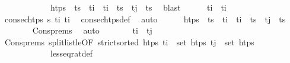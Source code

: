 \begin{isabellebody}
\ \ \ \ \ \ \ \ \ \ \ \ {\isacartoucheopen}htps\ {\isacharequal}{\kern0pt}\ ts\ {\isacharat}{\kern0pt}\ t\isactrlsub i\ {\isacharhash}{\kern0pt}\ {\isacharparenleft}{\kern0pt}t\isactrlsub i{\isacharprime}{\kern0pt}\ {\isacharhash}{\kern0pt}\ ts\ {\isacharat}{\kern0pt}\ t\isactrlsub j\ {\isacharhash}{\kern0pt}\ ts\ \isamarkupfalse%
\ blast\isanewline
\ \ \ \ \isamarkupfalse%
\ {\isachardoublequoteopen}t\isactrlsub i\ {\isasymle}\ t\isactrlsub i{\isacharprime}{\kern0pt}{\isachardoublequoteclose}\isanewline
\ \ \ \ \ \ \isamarkupfalse%
\ {\isacartoucheopen}consec{\isacharunderscore}{\kern0pt}htps\ {\isasympi}s\ t\isactrlsub i\ t\isactrlsub i{\isacharprime}{\kern0pt}{\isacartoucheclose}\ \isamarkupfalse%
\ consec{\isacharunderscore}{\kern0pt}htps{\isacharunderscore}{\kern0pt}def\ \isamarkupfalse%
\ auto\isanewline
\ \ \ \ \isamarkupfalse%
\ {\isachardoublequoteopen}htps\ {\isacharequal}{\kern0pt}\ {\isacharparenleft}{\kern0pt}ts\ {\isacharat}{\kern0pt}\ {\isacharbrackleft}{\kern0pt}t\isactrlsub i{\isacharbrackright}{\kern0pt}{\isacharparenright}{\kern0pt}\ {\isacharat}{\kern0pt}\ t\isactrlsub i{\isacharprime}{\kern0pt}\ {\isacharhash}{\kern0pt}\ ts\ {\isacharat}{\kern0pt}\ t\isactrlsub j\ {\isacharhash}{\kern0pt}\ ts\isanewline
\ \ \ \ \ \ \isamarkupfalse%
\ Cons{\isachardot}{\kern0pt}prems\ \isamarkupfalse%
\ auto\isanewline
\ \ \ \ \isamarkupfalse%
\ \isamarkupfalse%
\ {\isachardoublequoteopen}t\isactrlsub i{\isacharprime}{\kern0pt}\ {\isasymle}\ t\isactrlsub j{\isachardoublequoteclose}\isanewline
\ \ \ \ \ \ \isamarkupfalse%
\ Cons{\isachardot}{\kern0pt}prems\ split{\isacharunderscore}{\kern0pt}list{}{\isacharunderscore}{\kern0pt}le{\isacharbrackleft}{\kern0pt}OF\ {\isacartoucheopen}strict{\isacharunderscore}{\kern0pt}sorted\ htps{\isacartoucheclose}\ {\isacartoucheopen}t\isactrlsub i{\isacharprime}{\kern0pt}\ {\isasymin}\ set\ htps{\isacartoucheclose}\ {\isacartoucheopen}t\isactrlsub j\ {\isasymin}\ set\ htps{\isacartoucheclose}{\isacharbrackright}{\kern0pt}\isanewline
\ \ \ \ \ \ \ \ \ \ \ \ less{\isacharunderscore}{\kern0pt}eq{\isacharunderscore}{\kern0pt}rat{\isacharunderscore}{\kern0pt}def\ \isamarkupfalse%

\end{isabellebody}
